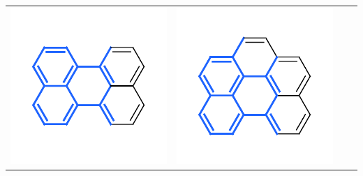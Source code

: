\documentclass[landscape,a0b,final,a4resizeable]{include/a0poster}
\begin{document}
\begin{poster}
\begin{multicols}{3}
\begin{center}
\begin{tabular}{>{\centering}m{\mywidthb} >{\centering}m{\mywidtha} >{\centering}m{\mywidtha} >{\centering\arraybackslash}m{\mywidtha}}
\includegraphics[width=\mywidtha, clip, trim = 2mm 3mm 2mm 6mm]{figures/fig_8.pdf}\vspace{-1em} &
\includegraphics[width=\mywidtha, clip, trim = 2mm 3mm 2mm 6mm]{figures/fig_9.pdf}\vspace{-1em} &

\end{tabular}
\end{center}
\end{multicols}
\end{poster}
\end{document}
